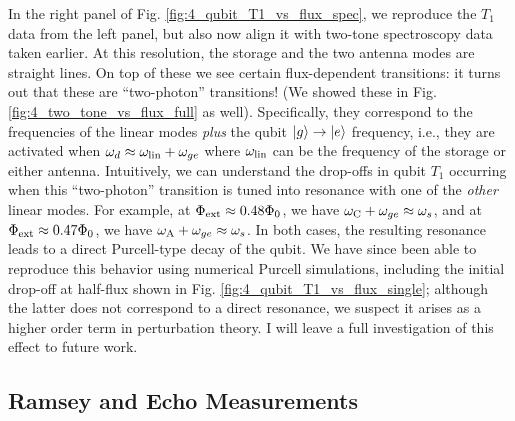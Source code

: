 In the right panel of Fig. \ref{fig:4_qubit_T1_vs_flux_spec}, we reproduce the $T_1$ data from the left panel, but also now align it with two-tone spectroscopy data taken earlier. At this resolution, the storage and the two antenna modes are straight lines. On top of these we see certain flux-dependent transitions: it turns out that these are ``two-photon'' transitions! (We showed these in Fig. \ref{fig:4_two_tone_vs_flux_full} as well). Specifically, they correspond to the frequencies of the linear modes \textit{plus} the qubit $\lvert g\rangle\to\lvert e\rangle$ frequency, i.e., they are activated when $\omega_d \approx \omega_{\rm lin} + \omega_{ge}$ where $\omega_{\rm lin}$ can be the frequency of the storage or either antenna. Intuitively, we can understand the drop-offs in qubit $T_1$ occurring when this ``two-photon'' transition is tuned into resonance with one of the \textit{other} linear modes. For example, at $\Phi_{\rm ext} \approx 0.48\Phi_0$, we have $\omega_{\rm C} + \omega_{ge} \approx \omega_{s}$, and at $\Phi_{\rm ext} \approx 0.47\Phi_0$, we have $\omega_{\rm A} + \omega_{ge} \approx \omega_{s}$. In both cases, the resulting resonance leads to a direct Purcell-type decay of the qubit. We have since been able to reproduce this behavior using numerical Purcell simulations, including the initial drop-off at half-flux shown in Fig. \ref{fig:4_qubit_T1_vs_flux_single}; although the latter does not correspond to a direct resonance, we suspect it arises as a higher order term in perturbation theory. I will leave a full investigation of this effect to future work. 

\subsection{Ramsey and Echo Measurements}

